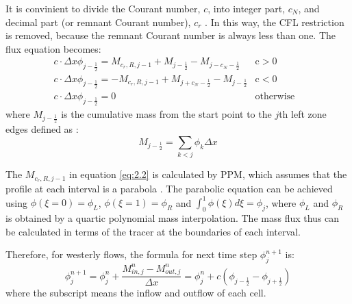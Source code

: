 It is convinient to divide the Courant number, $c$, into integer part, $c_N$, and decimal part (or remnant Courant number), $c_r$ \citep{Leonard1995}. In this way, the CFL restriction is removed, because the remnant Courant number is always less than one. The flux equation becomes:
\begin{eqnarray} \label{eq:2.2}
c\cdot \Delta x \phi_{j-\frac{1}{2}} = M_{c_r,R,j-1} + M_{j-\frac{1}{2}}-M_{j-c_N-\frac{1}{2}} & \text{c}>0 &\nonumber \\
c\cdot \Delta x \phi_{j-\frac{1}{2}} = -M_{c_r,R,j-1} +M_{j+c_N-\frac{1}{2}}- M_{j-\frac{1}{2}} & \text{c}<0 & \\
c\cdot \Delta x \phi_{j-\frac{1}{2}} = 0 & \text{otherwise} \nonumber 
\end{eqnarray}
where $M_{j-\frac{1}{2}}$ is the cumulative mass from the start point to the $j$th left zone edges defined as \citep{Colella1984}:
\begin{equation} \label{eq:2.3}
M_{j-\frac{1}{2}} = \sum_{k < j} \phi_{k}\Delta x
\end{equation}

The $M_{c_r,R,j-1}$ in equation \ref{eq:2.2} is calculated by PPM, which assumes that the profile at each interval is a parabola \citep{Colella1984}. The parabolic equation can be achieved using $\phi(\xi = 0) = \phi_L$, $\phi(\xi = 1) = \phi_R$ and $ \int^{1}_{0} \phi (\xi) d\xi = \phi_j  $, where $\phi_L$ and $\phi_R$ is obtained by a quartic polynomial mass interpolation. The mass flux thus can be calculated in terms of the tracer at the boundaries of each interval.

Therefore, for westerly flows, the formula for next time step $\phi^{n+1}_j$ is: 
\begin{equation} \label{eq:2.12}
\phi^{n+1}_j = \phi^n_j + \frac{M^n_{in,j} - M^n_{out,j}}{\Delta x} = \phi^n_j + c(\phi_{j-\frac{1}{2}} - \phi_{j+\frac{1}{2}})%
\end{equation}
where the subscript means the inflow and outflow of each cell.

